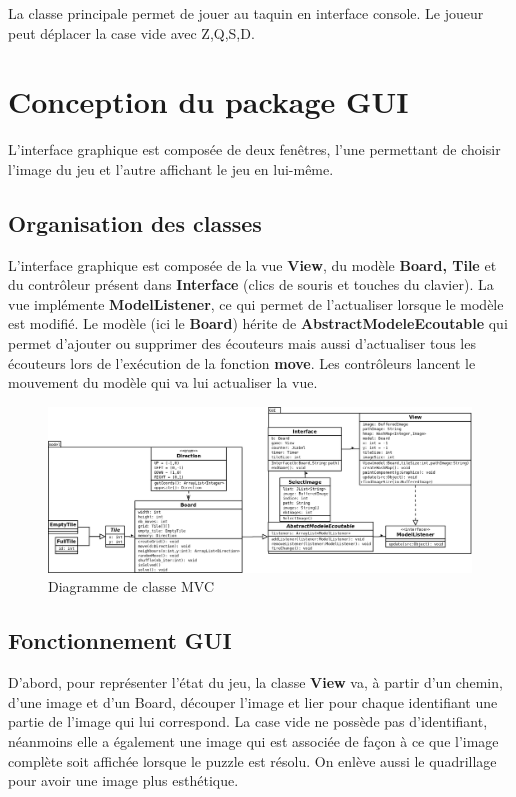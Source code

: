 \documentclass[a4paper,12pt]{article} %
\begin{document}
La classe principale permet de jouer au taquin en interface console. Le joueur peut déplacer la case vide avec Z,Q,S,D.

\section{Conception du package GUI}

L'interface graphique est composée de deux fenêtres, l'une permettant de choisir l'image du jeu et l'autre affichant le jeu en lui-même.

\subsection{Organisation des classes}

L'interface graphique est composée de la vue \textbf{View}, du modèle \textbf{Board, Tile} et du contrôleur présent dans \textbf{Interface} (clics de souris et touches du clavier). La vue implémente \textbf{ModelListener}, ce qui permet de l'actualiser lorsque le modèle est modifié. Le modèle (ici le \textbf{Board}) hérite de \textbf{AbstractModeleEcoutable} qui permet d'ajouter ou supprimer des écouteurs mais aussi d'actualiser tous les écouteurs lors de l'exécution de la fonction \textbf{move}. Les contrôleurs lancent le mouvement du modèle qui va lui actualiser la vue.

\begin{figure}[!h]
\centering
\includegraphics[scale=0.25]{images/mvc.png}
\caption{Diagramme de classe MVC}
\end{figure}
 

\subsection{Fonctionnement GUI}

D'abord, pour représenter l'état du jeu, la classe \textbf{View} va, à partir d'un chemin, d'une image et d'un Board, découper l'image et lier pour chaque identifiant une partie de l'image qui lui correspond. La case vide ne possède pas d'identifiant, néanmoins elle a également une image qui est associée de façon à ce que l'image complète soit affichée lorsque le puzzle est résolu. On enlève aussi le quadrillage pour avoir une image plus esthétique.
\end{document}

